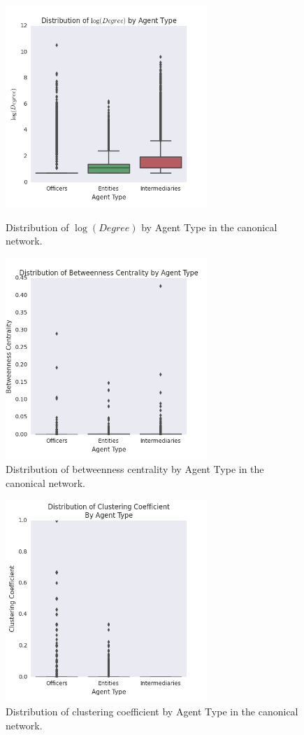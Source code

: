 \documentclass[11pt]{article}
\begin{document}
\begin{figure}[H]
\centering
\begin{minipage}{.5\textwidth}
  \centering
  \includegraphics[width=3in]{figures/figure5.png}
  \caption{Distribution of $\log(Degree)$
        by Agent Type in the canonical network.}
  \label{fig5}
\end{minipage}%
\begin{minipage}{.5\textwidth}
  \centering
  \includegraphics[width=3in]{figures/figure6.png}
  \caption{Distribution of betweenness centrality by Agent Type in the 
        canonical network.}
  \label{fig6}
\end{minipage}
\end{figure}

\begin{figure}[H]
    \centering
    \includegraphics[width = 3in]{figures/figure7.png}
    \caption{Distribution of clustering coefficient by Agent Type in the
        canonical network.}
\end{figure}
\end{document}
